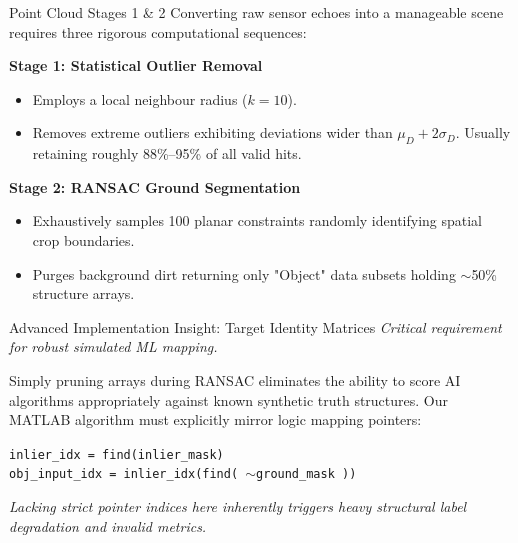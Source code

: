 \documentclass[10pt,aspectratio=169]{beamer}
\begin{document}
\begin{frame}{Point Cloud Stages 1 \& 2}
    Converting raw sensor echoes into a manageable scene requires three rigorous computational sequences:
    
    \vspace{3mm}
    \textbf{Stage 1: Statistical Outlier Removal}
    \begin{itemize}
        \item Employs a local neighbour radius ($k=10$).
        \item Removes extreme outliers exhibiting deviations wider than $\mu_D + 2\sigma_D$. Usually retaining roughly 88\%--95\% of all valid hits.
    \end{itemize}
    
    \vspace{3mm}
    \textbf{Stage 2: RANSAC Ground Segmentation}
    \begin{itemize}
        \item Exhaustively samples 100 planar constraints randomly identifying spatial crop boundaries.
        \item Purges background dirt returning only "Object" data subsets holding $\sim$50\% structure arrays.
    \end{itemize}
\end{frame}

\begin{frame}{Advanced Implementation Insight: Target Identity Matrices}
    \textit{Critical requirement for robust simulated ML mapping.}
    
    \vspace{4mm}
    Simply pruning arrays during RANSAC eliminates the ability to score AI algorithms appropriately against known synthetic truth structures. Our MATLAB algorithm must explicitly mirror logic mapping pointers:
    
    \vspace{3mm}
    \texttt{inlier\_idx = find(inlier\_mask)} \\
    \texttt{obj\_input\_idx = inlier\_idx(find( $\sim$ground\_mask ))}
    
    \vspace{4mm}
    \textit{Lacking strict pointer indices here inherently triggers heavy structural label degradation and invalid metrics.}
\end{frame}
\end{document}

